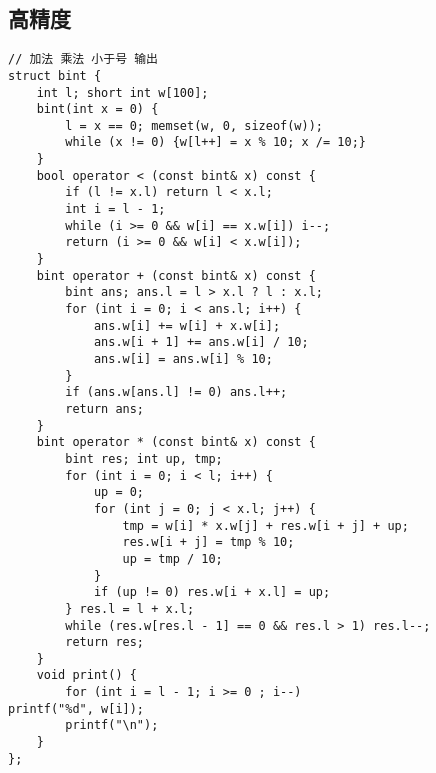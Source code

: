 \documentclass[a4]{article}
\begin{document}
\subsection{高精度}
\begin{lstlisting}
// 加法 乘法 小于号 输出
struct bint {
	int l; short int w[100];
	bint(int x = 0) {
		l = x == 0; memset(w, 0, sizeof(w));
		while (x != 0) {w[l++] = x % 10; x /= 10;}
	}
	bool operator < (const bint& x) const {
		if (l != x.l) return l < x.l;
		int i = l - 1;
		while (i >= 0 && w[i] == x.w[i]) i--;
		return (i >= 0 && w[i] < x.w[i]);
	}
	bint operator + (const bint& x) const {
		bint ans; ans.l = l > x.l ? l : x.l;
		for (int i = 0; i < ans.l; i++) {
			ans.w[i] += w[i] + x.w[i];
			ans.w[i + 1] += ans.w[i] / 10;
			ans.w[i] = ans.w[i] % 10;
		}
		if (ans.w[ans.l] != 0) ans.l++;
		return ans;
	}
	bint operator * (const bint& x) const {
		bint res; int up, tmp;
		for (int i = 0; i < l; i++) {
			up = 0;
			for (int j = 0; j < x.l; j++) {
				tmp = w[i] * x.w[j] + res.w[i + j] + up;
				res.w[i + j] = tmp % 10;
				up = tmp / 10;
			}
			if (up != 0) res.w[i + x.l] = up;
		} res.l = l + x.l;
		while (res.w[res.l - 1] == 0 && res.l > 1) res.l--;
		return res;
	}
	void print() {
		for (int i = l - 1; i >= 0 ; i--)
printf("%d", w[i]);
		printf("\n");
	}
};
\end{lstlisting}
\end{document}
